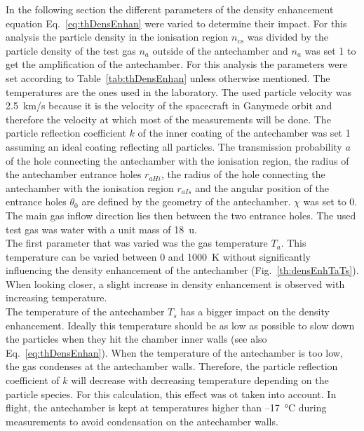 	In the following section the different parameters of the density enhancement equation Eq.~\eqref{eq:thDensEnhan} were varied to determine their impact. For this analysis the particle density in the ionisation region $n_{cs}$ was divided by the particle density of the test gas $n_a$ outside of the antechamber and $n_a$ was set 1 to get the amplification of the antechamber. For this analysis the parameters were set according to Table~\ref{tab:thDensEnhan} unless otherwise mentioned. The temperatures are the ones used in the laboratory. The used particle velocity was 2.5~km/s because it is the velocity of the spacecraft in Ganymede orbit and therefore the velocity at which most of the measurements will be done. The particle reflection coefficient $k$ of the inner coating of the antechamber was set 1 assuming an ideal coating reflecting all particles. The transmission probability $a$ of the hole connecting the antechamber with the ionisation region, the radius of the antechamber entrance holes $r_{aHi}$, the radius of the hole connecting the antechamber with the ionisation region $r_{aIs}$ and the angular position of the entrance holes $\theta_0$ are defined by the geometry of the antechamber. $\chi$ was set to 0\degree. The main gas inflow direction lies then between the two entrance holes. The used test gas was water with a unit mass of 18~u.\\ %
	The first parameter that was varied was the gas temperature $T_a$. This temperature can be varied between 0 and 1000~K without significantly influencing the density enhancement of the antechamber (Fig.~\ref{th:densEnhTaTs}). When looking closer, a slight increase in density enhancement is observed with increasing temperature.\\
	The temperature of the antechamber $T_s$ has a bigger impact on the density enhancement. Ideally this temperature should be as low as possible to slow down the particles when they hit the chamber inner walls (see also Eq.~\eqref{eq:thDensEnhan}). When the temperature of the antechamber is too low, the gas condenses at the antechamber walls. Therefore, the particle reflection coefficient of $k$ will decrease with decreasing temperature depending on the particle species. For this calculation, this effect was ot taken into account. In flight, the antechamber is kept at temperatures higher than --17~\si{\degreeCelsius} during measurements to avoid condensation on the antechamber walls.\\
